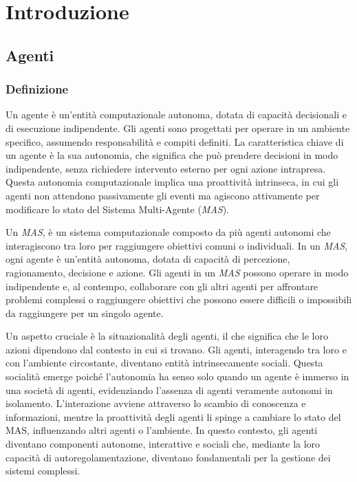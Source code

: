 \section{Introduzione}

\subsection{Agenti}

\subsubsection{Definizione}
Un agente è un'entità computazionale autonoma, dotata di capacità decisionali e di esecuzione indipendente. Gli agenti sono progettati per operare in un ambiente specifico, assumendo responsabilità e compiti definiti. La caratteristica chiave di un agente è la sua autonomia, che significa che può prendere decisioni in modo indipendente, senza richiedere intervento esterno per ogni azione intrapresa. Questa autonomia computazionale implica una proattività intrinseca, in cui gli agenti non attendono passivamente gli eventi ma agiscono attivamente per modificare lo stato del Sistema Multi-Agente (\textit{MAS}).

Un \textit{MAS}, è un sistema computazionale composto da più agenti autonomi che interagiscono tra loro per raggiungere obiettivi comuni o individuali. In un \textit{MAS}, ogni agente è un'entità autonoma, dotata di capacità di percezione, ragionamento, decisione e azione. Gli agenti in un \textit{MAS} possono operare in modo indipendente e, al contempo, collaborare con gli altri agenti per affrontare problemi complessi o raggiungere obiettivi che possono essere difficili o impossibili da raggiungere per un singolo agente.

Un aspetto cruciale è la situazionalità degli agenti, il che significa che le loro azioni dipendono dal contesto in cui si trovano. Gli agenti, interagendo tra loro e con l'ambiente circostante, diventano entità intrinsecamente sociali. Questa socialità emerge poiché l'autonomia ha senso solo quando un agente è immerso in una società di agenti, evidenziando l'assenza di agenti veramente autonomi in isolamento. L'interazione avviene attraverso lo scambio di conoscenza e informazioni, mentre la proattività degli agenti li spinge a cambiare lo stato del MAS, influenzando altri agenti o l'ambiente. In questo contesto, gli agenti diventano componenti autonome, interattive e sociali che, mediante la loro capacità di autoregolamentazione, diventano fondamentali per la gestione dei sistemi complessi.

